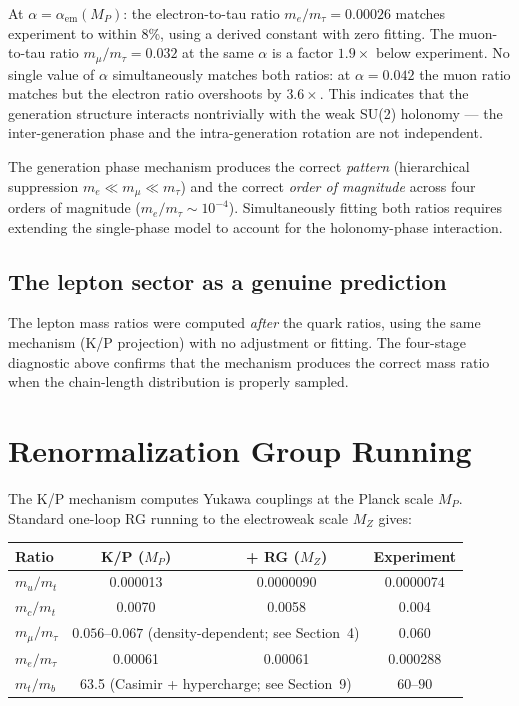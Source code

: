 \documentclass[11pt,letterpaper]{article}
\begin{document}
\noindent At $\alpha = \alpha_{\mathrm{em}}(M_P)$: the electron-to-tau
ratio $m_e/m_\tau = 0.00026$ matches experiment to within 8\%, using a
derived constant with zero fitting.  The muon-to-tau ratio
$m_\mu/m_\tau = 0.032$ at the same $\alpha$ is a factor $1.9\times$
below experiment.  No single value of $\alpha$ simultaneously matches
both ratios: at $\alpha = 0.042$ the muon ratio matches but the
electron ratio overshoots by $3.6\times$.  This indicates that the
generation structure interacts nontrivially with the weak SU(2)
holonomy --- the inter-generation phase and the intra-generation
rotation are not independent.

The generation phase mechanism produces the correct \emph{pattern}
(hierarchical suppression $m_e \ll m_\mu \ll m_\tau$) and the correct
\emph{order of magnitude} across four orders of magnitude
($m_e/m_\tau \sim 10^{-4}$).  Simultaneously fitting both ratios
requires extending the single-phase model to account for the
holonomy-phase interaction.

\subsection{The lepton sector as a genuine prediction}

The lepton mass ratios were computed \emph{after} the quark ratios,
using the same mechanism (K/P projection) with no adjustment or
fitting.  The four-stage diagnostic above confirms that the
mechanism produces the correct mass ratio when the chain-length
distribution is properly sampled.

\section{Renormalization Group Running}

The K/P mechanism computes Yukawa couplings at the Planck scale
$M_P$. Standard one-loop RG running to the electroweak scale $M_Z$
gives:

\begin{center}
\begin{tabular}{@{}lccc@{}}
\toprule
Ratio & K/P ($M_P$) & + RG ($M_Z$) & Experiment \\
\midrule
$m_u/m_t$ & 0.000013 & 0.0000090 & 0.0000074 \\
$m_c/m_t$ & 0.0070 & 0.0058 & 0.004 \\
$m_\mu/m_\tau$ & \multicolumn{2}{c}{$0.056$--$0.067$ (density-dependent; see Section~4)} & 0.060 \\
$m_e/m_\tau$ & 0.00061 & 0.00061 & 0.000288 \\
$m_t/m_b$ & \multicolumn{2}{c}{63.5 (Casimir + hypercharge; see Section~9)} & $60$--$90$ \\
\bottomrule
\end{tabular}
\end{center}
\end{document}

